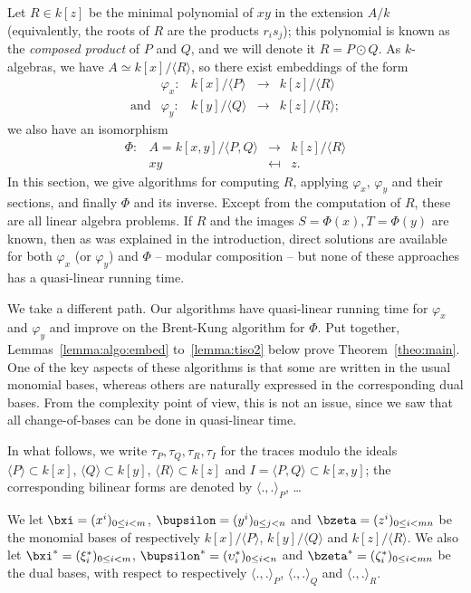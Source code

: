\documentclass{sig-alternate}
\newcounter{algo}
\newcommand{\ang}[1]{\langle#1\rangle}
\begin{document}
Let $R \in k[z]$ be the minimal polynomial of $xy$ in the extension
$A/k$ (equivalently, the roots of $R$ are the products $r_i s_j$);
this polynomial is known as the {\em composed product} of $P$ and $Q$,
and we will denote it $R = P \odot Q$. As $k$-algebras, we have $A
\simeq k[x]/\ang{R}$, so there exist embeddings of the form
$$
\begin{array}{ccccc}
&\varphi_x: & k[x]/\ang{P} & \to & k[z]/\ang{R}\\[2mm]
\text{and} & \varphi_y: & k[y]/\langle Q \rangle & \to & k[z]/\ang{R};
\end{array}
$$
we also have an isomorphism 
$$\begin{array}{cccc} 
\Phi:&  A=k[x,y]/\langle P,Q\rangle & \to & k[z]/\ang{R} \\
&  xy & \mapsfrom & z.
\end{array}$$
In this section, we give algorithms for computing $R$, applying
$\varphi_x$, $\varphi_y$ and their sections, and finally $\Phi$ and its inverse. Except from the
computation of $R$, these are all linear algebra problems. If $R$ and
the images $S=\Phi(x),T=\Phi(y)$ are known, then as was explained in
the introduction, direct solutions are available for both $\varphi_x$
(or $\varphi_y$) and $\Phi$ -- modular composition -- but none of
these approaches has a quasi-linear running time.

We take a different path. Our algorithms have quasi-linear running
time for $\varphi_x$ and $\varphi_y$ and improve on the Brent-Kung
algorithm for $\Phi$. Put together, Lemmas~\ref{lemma:algo:embed}
to~\ref{lemma:tiso2} below prove Theorem~\ref{theo:main}. One of the
key aspects of these algorithms is that some are written in the usual
monomial bases, whereas others are naturally expressed in the
corresponding dual bases. From the complexity point of view, this is
not an issue, since we saw that all change-of-bases can be done in
quasi-linear time.

In what follows, we write $\tau_P,\tau_Q,\tau_R,\tau_I$ for the traces
modulo the ideals $\ang{P}\subset k[x]$, $\ang{Q} \subset k[y]$,
$\ang{R} \subset k[z]$ and $I=\ang{P,Q} \subset k[x,y]$; the
corresponding bilinear forms are denoted by $\ang{.,.}_P$, \dots

We let $\bxi=(x^i)_{0 \le i < m}$, $\bupsilon=(y^i)_{0 \le j <
  n}$ and $\bzeta = (z^i)_{0 \le i < mn}$ be the monomial bases of
respectively $k[x]/\ang{P}$, $k[y]/\ang{Q}$ and $k[z]/\ang{R}$. We also let
$\bxi^\ast=(\xi^\ast_i)_{0 \le i <m}$,
$\bupsilon^\ast=(\upsilon^\ast_i)_{0 \le i < n}$ and
$\bzeta^\ast=(\zeta^\ast_i)_{0 \le i < mn}$ be the dual bases, with
respect to respectively $\ang{.,.}_P$, $\ang{.,.}_Q$ and
$\ang{.,.}_R$.
\end{document}
